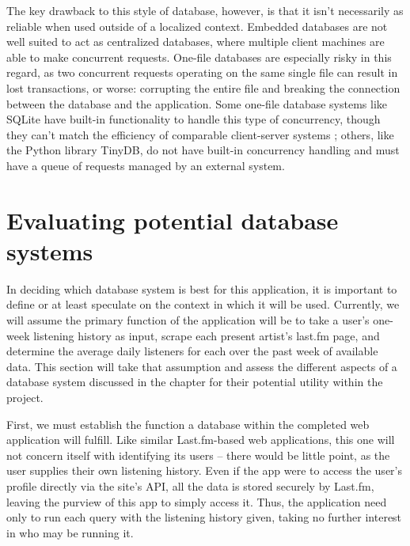 The key drawback to this style of database, however, is that it isn't necessarily as reliable when used outside of a localized context. Embedded databases are not well suited to act as centralized databases, where multiple client machines are able to make concurrent requests. One-file databases are especially risky in this regard, as two concurrent requests operating on the same single file can result in lost transactions, or worse: corrupting the entire file and breaking the connection between the database and the application. Some one-file database systems like SQLite have built-in functionality to handle this type of concurrency, though they can't match the efficiency of comparable client-server systems \cite{noauthor_appropriate_2025}; others, like the Python library TinyDB, do not have built-in concurrency handling and must have a queue of requests managed by an external system.

\section{Evaluating potential database systems}

In deciding which database system is best for this application, it is important to define or at least speculate on the context  in which it will be used. Currently, we will assume the primary function of the application will be to take a user's one-week listening history as input, scrape each present artist's last.fm page, and determine the average daily listeners for each over the past week of available data. This section will take that assumption and assess the different aspects of a database system discussed in the chapter for their potential utility within the project.

First, we must establish the function a database within the completed web application will fulfill. Like similar Last.fm-based web applications, this one will not concern itself with identifying its users -- there would be little point, as the user supplies their own listening history. Even if the app were to access the user's profile directly via the site's API, all the data is stored securely by Last.fm, leaving the purview of this app to simply access it. Thus, the application need only to run each query with the listening history given, taking no further interest in who may be running it.

